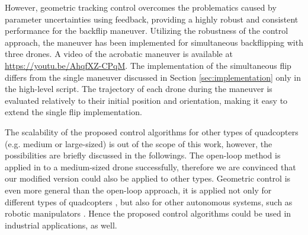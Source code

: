 However, geometric tracking control overcomes the problematics caused by parameter uncertainties using feedback, providing a highly robust and consistent performance for the backflip maneuver. Utilizing the robustness of the control approach, the maneuver has been implemented for simultaneous backflipping with three drones. A video of the acrobatic maneuver is available at \url{https://youtu.be/AhqfXZ-CPqM}. The implementation of the simultaneous flip differs from the single maneuver discussed in Section \ref{sec:implementation} only in the high-level script. The trajectory of each drone during the maneuver is evaluated relatively to their initial position and orientation, making it easy to extend the single flip implementation. %

The scalability of the proposed control algorithms for other types of quadcopters (e.g. medium or large-sized) is out of the scope of this work, however, the possibilities are briefly discussed in the followings. The open-loop method is applied in \cite{LSICRA2010} to a medium-sized drone successfully, therefore we are convinced that our modified version could also be applied to other types. Geometric control is even more general than the open-loop approach, it is applied not only for different types of quadcopters \cite{turpinkumar2011}, but also for other autonomous systems, such as robotic manipulators \cite{bullo2004}. Hence the proposed control algorithms could be used in industrial applications, as well.